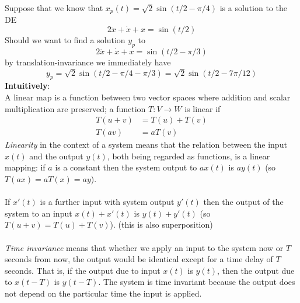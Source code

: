 \documentclass{report}
\begin{document}
Suppose that we know that $x_p(t)=\sqrt{2}\sin(t/2-\pi/4)$ is a solution to the DE
\begin{equation*}
2\ddot{x}+\dot{x}+x=\sin(t/2)
\end{equation*}
Should we want to find a solution $y_p$ to 
\begin{equation*}
2\ddot{x}+\dot{x}+x=\sin(t/2-\pi/3)
\end{equation*}
by translation-invariance we immediately have
\begin{equation*}
y_p=\sqrt{2}\sin(t/2-\pi/4-\pi/3)=\sqrt{2}\sin(t/2-7\pi/12)
\end{equation*}
\newpage
\noindent\textbf{Intuitively}:\\
A linear map is a function between two vector spaces where addition and scalar multiplication are preserved;
a function $T:V\to W$ is linear if 
\begin{align*}
T(u+v)&=T(u)+T(v)\\
T(av)&=aT(v)
\end{align*}
\textit{Linearity} in the context of a system means that the relation between the input $x(t)$ and the output $y(t)$, both being regarded as functions, is a linear mapping: if $a$ is a constant then the system output to $ax(t)$ is $ay(t)$ (so $T(ax)=aT(x)=ay$).\\
\vspace{1mm}\\
If $x'(t)$ is a further input with system output $y'(t)$ then the output
of the system to an input $x(t)+x'(t)$ is $y(t)+y'(t)$ (so $T(u+v)=T(u)+T(v)$). (this is also superposition)\\
\vspace{1mm}\\
\textit{Time invariance} means that whether we apply an input to the system now or $T$ seconds from now, the output would be identical except for a time delay of $T$ seconds. That is, if the output due to input $x(t)$ is $y(t)$, then the output due to $x(t-T)$ is $y(t-T)$. The
system is time invariant because the output does not depend on the particular time the input is applied.
\newpage
\end{document}
